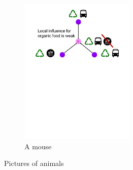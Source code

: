 \documentclass{article}
\begin{document}
\begin{figure}[htb]
               \begin{subfigure}[b]{0.6\textwidth}
                       \includegraphics[width=0.6\textwidth]{figs/timeline-3a}
                       \caption{A mouse}
                       \label{fig:mouse}
               \end{subfigure}
               \caption{Pictures of animals}\label{fig:animals}
\end{figure}
\end{document}
